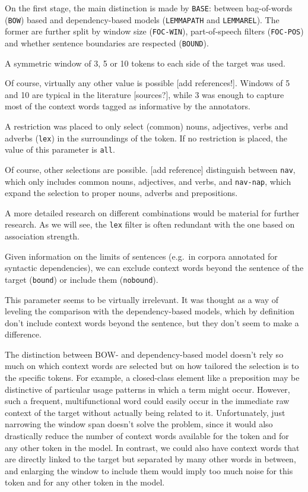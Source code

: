 \documentclass[
]{book}
\providecommand{\tightlist}{%
  \setlength{\itemsep}{0pt}\setlength{\parskip}{0pt}}
\begin{document}
On the first stage, the main distinction is made by \texttt{BASE}: between bag-of-words (\texttt{BOW}) based
and dependency-based models (\texttt{LEMMAPATH} and \texttt{LEMMAREL}).
The former are further split by window size (\texttt{FOC-WIN}), part-of-speech filters (\texttt{FOC-POS})
and whether sentence boundaries are respected (\texttt{BOUND}).

\begin{description}
\tightlist
\item[\texttt{FOC-WIN} (first order window)]
A symmetric window of 3, 5 or 10 tokens to each side of the target was used.

Of course, virtually any other value is possible {[}add references!{]}. Windows of
5 and 10 are typical in the literature {[}sources?{]}, while 3 was enough to capture most
of the context words tagged as informative by the annotators.
\item[\texttt{FOC-POS} (first order part-of-speech)]
A restriction was placed to only select (common) nouns, adjectives, verbs and adverbs (\texttt{lex})
in the surroundings of the token. If no restriction is placed, the value of this parameter is \texttt{all}.

Of course, other selections are possible. {[}add reference{]} distinguish between
\texttt{nav}, which only includes common nouns, adjectives, and verbs, and \texttt{nav-nap}, which
expand the selection to proper nouns, adverbs and prepositions.

A more detailed research on different combinations would be material for further
research. As we will see, the \texttt{lex} filter is often redundant with the one based on
association strength.
\item[\texttt{BOUNDARIES}]
Given information on the limits of sentences (e.g.~in corpora annotated for
syntactic dependencies), we can exclude context words beyond the sentence of the target (\texttt{bound})
or include them (\texttt{nobound}).

This parameter seems to be virtually irrelevant. It was thought as a way of
leveling the comparison with the dependency-based models, which by definition don't
include context words beyond the sentence, but they don't seem to make a difference.
\end{description}

The distinction between BOW- and dependency-based model doesn't rely so much on
which context words are selected but on how tailored the selection is to the specific
tokens. For example, a closed-class element like a preposition may be distinctive
of particular usage patterns in which a term might occur. However, such a frequent,
multifunctional word could easily occur in the immediate raw context of the target
without actually being related to it. Unfortunately, just narrowing the window span
doesn't solve the problem, since it would also drastically reduce the number of
context words available for the token and for any other token in the model.
In contrast, we could also have context words that are directly linked to the target
but separated by many other words in between, and enlarging the window to include
them would imply too much noise for this token and for any other token in the model.
\end{document}
